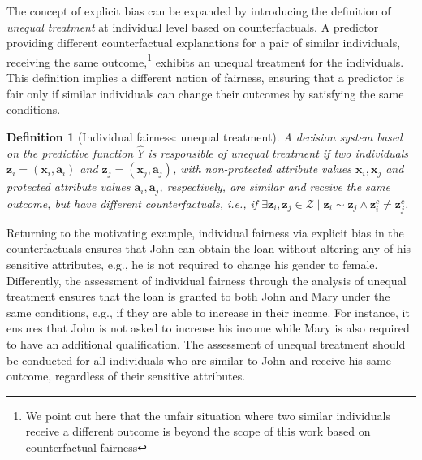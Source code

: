 \documentclass[letterpaper]{article} %
\newtheorem{definition}{Definition}
\begin{document}
The concept of explicit bias can be expanded by introducing the definition of \emph{unequal treatment} at individual level based on counterfactuals.
%
A predictor providing different counterfactual explanations for a pair of similar individuals, receiving the same outcome,\footnote{We point out here that the unfair situation where two similar individuals receive a different outcome is beyond the scope of this work based on counterfactual fairness} exhibits an unequal treatment for the individuals.
%
This definition implies a different notion of fairness, ensuring that a predictor is fair only if similar individuals can change their outcomes by satisfying the same conditions. 

\begin{definition}[Individual fairness: unequal treatment]\label{unequal_treatment}
	A decision system based on the predictive function $\hat{Y}$ is responsible of \emph{unequal treatment} if two individuals $\boldsymbol{z}_i = (\boldsymbol{x}_i, \boldsymbol{a}_i)$ and $\boldsymbol{z}_j = (\boldsymbol{x}_j, \boldsymbol{a}_j)$, with non-protected attribute values $\boldsymbol{x}_i, \boldsymbol{x}_j$ and protected attribute values $\boldsymbol{a}_i, \boldsymbol{a}_j$, respectively, are similar and receive the same outcome, but have different counterfactuals, i.e., if $\exists \boldsymbol{z}_i, \boldsymbol{z}_j \in \mathcal{Z} \mid \boldsymbol{z}_i \sim \boldsymbol{z}_j \wedge \boldsymbol{z}_i^c \neq \boldsymbol{z}_j^c$.
\end{definition}

Returning to the motivating example, individual fairness via explicit bias in the counterfactuals ensures that John can obtain the loan without altering any of his sensitive attributes, e.g., he is not required to change his gender to female.
%
Differently, the assessment of individual fairness through the analysis of unequal treatment ensures that the loan is granted to both John and Mary under the same conditions, e.g., if they are able to increase in their income. For instance, it ensures that John is not asked to increase his income while Mary is also required to have an additional qualification.
%
The assessment of unequal treatment should be conducted for all individuals who are similar to John and receive his same outcome, regardless of their sensitive attributes.
\end{document}
